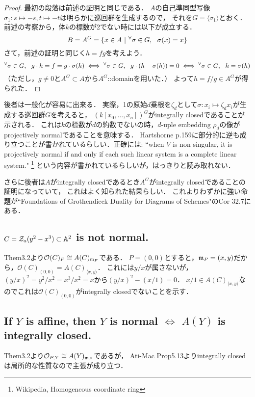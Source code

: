\documentclass[a4paper]{jsarticle}
\begin{document}
    \begin{proof}
        最初の段落は前述の証明と同じである．
        $A$の自己準同型写像$\sigma_1: s \mapsto -s, t \mapsto -t$は明らかに巡回群を生成するので，
        それを$G=\langle \sigma_1 \rangle$とおく．
        前述の考察から，体$k$の標数が2でない時には以下が成立する．
        \[ B=A^G=\{x \in A ~|~ {}^{\forall} \sigma \in G,~~ \sigma(x)=x \} \]
        さて，前述の証明と同じく$h=fg$を考えよう．
        \[
            {}^{\forall} \sigma \in G,~~ g \cdot h=f=g \cdot \sigma(h)
            \iff {}^{\forall} \sigma \in G,~~ g \cdot (h-\sigma(h))=0
            \iff {}^{\forall} \sigma \in G,~~ h=\sigma(h)
        \]
        （ただし，$g \neq 0$と$A^G \subset A$から$A^G$::domainを用いた．）
        よって$h=f/g \in A^G$が得られた．
    \end{proof}
    後者は一般化が容易に出来る．
    実際，1の原始$d$乗根を$\zeta_d$として$\sigma: x_i \mapsto \zeta_d x_i$が生成する巡回群$G$を考えると，
    $(k[x_0,\dots,x_n])^G$がintegrally closedであることが示される．
    これは$k$の標数が$d$の約数でないの時，$d$-uple embedding $\rho_d$の像がprojectively normalであることを意味する．
    Hartshorne p.159に部分的に逆も成り立つことが書かれているらしい．正確には:
    ``when $V$ is non-singular, it is projectively normal if and only if each such linear system is a complete linear system."
    \footnote{Wikipedia, Homogeneous coordinate ring}
    という内容が書かれているらしいが，はっきりと読み取れない．

    さらに後者は$A$がintegrally closedであるとき$A^G$がintegrally closedであることの証明になっていて，
    これはよく知られた結果らしい．
    これよりわずかに強い命題が``Foundations of Grothendieck Duality for Diagrams of Schemes"のCor 32.7にある．

    \subsection{$C=\mathcal{Z}_a(y^2-x^3) \subset \mathbb{A}^2$ is not normal.}
    Them3.2より$\mathcal{O}(C)_P \cong A(C)_{\mathfrak{m}_P}$である．
    $P=(0,0)$とすると，$\mathfrak{m}_P=(x,y)$だから，$\mathcal{O}(C)_{(0,0)}=A(C)_{\langle x,y \rangle}$．
    これには$y/x$が属さないが，$(y/x)^2=y^2/x^2=x^3/x^2=x$から$(y/x)^2-(x/1)=0$．
    $x/1 \in A(C)_{\langle x,y \rangle}$なのでこれは$\mathcal{O}(C)_{(0,0)}$がintegrally closedでないことを示す．

    \subsection{If $Y$ is affine, then $Y$ is normal $\iff$ $A(Y)$ is integrally closed.}
    Them3.2より$\mathcal{O}_{P,Y} \cong A(Y)_{\mathfrak{m}_P}$であるが，
    Ati-Mac Prop5.13よりintegrally closedは局所的な性質なので主張が成り立つ．
\end{document}
